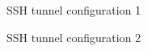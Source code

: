 \begin{figure}[htbp]
	\centering
	\caption{SSH tunnel configuration 1}
	\label{fig:putty1}
\end{figure}

\begin{figure}[htbp]
	\centering
	\caption{SSH tunnel configuration 2}
	\label{fig:putty2}
\end{figure}

